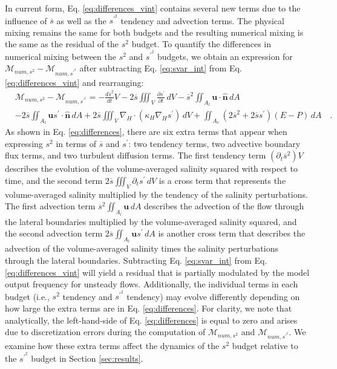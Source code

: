 In current form, Eq. \ref{eq:differences_vint} contains several new terms due to the influence of $\overline{s}$ as well as the $s^{\prime^2}$ tendency and advection terms. The physical mixing remains the same for both budgets and the resulting numerical mixing is the same as the residual of the $s^2$ budget. To quantify the differences in numerical mixing between the $s^2$ and $s^{\prime^2}$ budgets, we obtain an expression for $\mathcal{M}_{num, s^2}-\mathcal{M}_{num, s^{\prime^2}}$ after subtracting Eq. \ref{eq:svar_int} from Eq. \ref{eq:differences_vint} and rearranging:
\begin{equation} \label{eq:differences}
    \begin{split}
    & \mathcal{M}_{num, s^2} - \mathcal{M}_{num, s^{\prime^2}}=-\frac{d \overline{s}^2}{d t} V   - 2\overline{s} \iiint_V \frac{\partial s^\prime}{\partial t} \, dV- \overline{s}^2 \iint_{A_l} \mathbf{u} \cdot \hat{\mathbf{n}} \, dA  \\ 
    & -2 \overline{s} \iint_{A_l} \mathbf{u}s^{\prime} \cdot \hat{\mathbf{n}} \, dA  + 2 \overline{s} \iiint_{V} \nabla_H \cdot \left(\kappa_H \nabla_H s^{\prime} \right) \, dV + \iint_{A_v} \left(2\overline{s}^2+2 \overline{s} s^\prime \right)(E-P) \, dA \quad .
    \end{split}
\end{equation}
As shown in Eq. \ref{eq:differences}, there are six extra terms that appear when expressing $s^2$ in terms of $\overline{s}$ and $s^{\prime}$: two tendency terms, two advective boundary flux terms, and two turbulent diffusion terms. The first tendency term $(\partial_t \overline{s}^2) V$ describes the evolution of the volume-averaged salinity squared with respect to time, and the second term $2\overline{s} \iiint_V \partial_t s^\prime \, dV$ is a cross term that represents the volume-averaged salinity multiplied by the tendency of the salinity perturbations. The first advection term $\overline{s}^2 \iint_{A_l} \mathbf{u} \, dA$ describes the advection of the flow through the lateral boundaries multiplied by the volume-averaged salinity squared, and the second advection term $2 \overline{s} \iint_{A_l} \textbf{u}s^{\prime} \, dA$ is another cross term that describes the advection of the volume-averaged salinity times the salinity perturbations through the lateral boundaries. Subtracting Eq. \ref{eq:svar_int} from Eq. \ref{eq:differences_vint} will yield a residual that is partially modulated by the model output frequency for unsteady flows. Additionally, the individual terms in each budget (i.e., $s^2$ tendency and $s^{\prime^2}$ tendency) may evolve differently depending on how large the extra terms are in Eq. \ref{eq:differences}. For clarity, we note that analytically, the left-hand-side of Eq. \ref{eq:differences} is equal to zero and arises due to discretization errors during the computation of $\mathcal{M}_{num, s^2}$ and $\mathcal{M}_{num, s^{\prime^2}}$.  We examine how these extra terms affect the dynamics of the $s^2$ budget relative to the $s^{\prime^2}$ budget in Section \ref{sec:results}.

